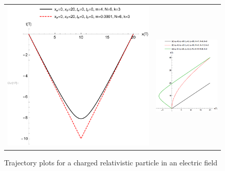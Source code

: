 \documentclass[12pt]{revtex4}
\begin{document}
\begin{figure}
	\begin{tabular} {cc}
		\includegraphics[width=0.4\linewidth]{traj1} &   \includegraphics[width=0.4\linewidth]{traj2} \\ 
	\end{tabular}
	\caption{Trajectory plots for a charged relativistic particle in an electric field}
	\label{fig:trajects}
\end{figure}
\end{document}
